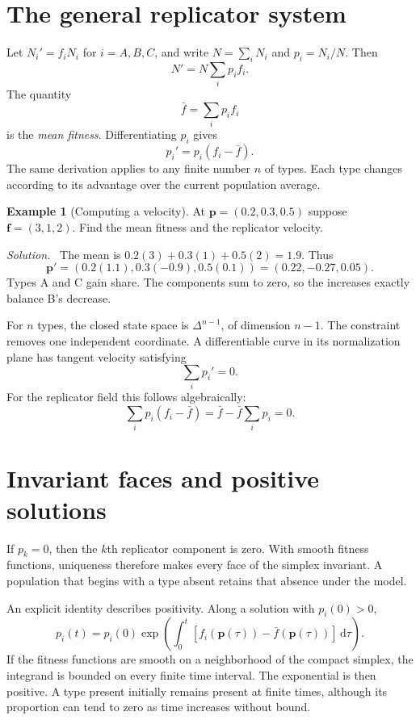 \documentclass[11pt,oneside,openany]{book}
\theoremstyle{definition}
\newtheorem{example}{Example}[chapter]
\theoremstyle{remark}
\newenvironment{solution}{\par\smallskip\noindent\textit{Solution.}\ }{\par\smallskip}
\newcommand{\dd}{\,\mathrm{d}}
\newcommand{\p}{\mathbf{p}}
\newcommand{\f}{\mathbf{f}}
\numberwithin{equation}{chapter}
\begin{document}
\section{The general replicator system}
Let $N_i'=f_iN_i$ for $i=A,B,C$, and write $N=\sum_iN_i$ and $p_i=N_i/N$. Then
\[
N'=N\sum_i p_i f_i.
\]
The quantity
\[
\bar f=\sum_i p_i f_i
\]
is the \emph{mean fitness}. Differentiating $p_i$ gives
\begin{equation}\label{eq:generalrep}
\boxed{p_i'=p_i(f_i-\bar f).}
\end{equation}
The same derivation applies to any finite number $n$ of types. Each type changes according to its advantage over the current population average.

\begin{example}[Computing a velocity]
At $\p=(0.2,0.3,0.5)$ suppose $\f=(3,1,2)$. Find the mean fitness and the replicator velocity.
\begin{solution}
The mean is $0.2(3)+0.3(1)+0.5(2)=1.9$. Thus
\[
\p'=(0.2(1.1),0.3(-0.9),0.5(0.1))=(0.22,-0.27,0.05).
\]
Types A and C gain share. The components sum to zero, so the increases exactly balance B's decrease.
\end{solution}
\end{example}

For $n$ types, the closed state space is $\Delta^{n-1}$, of dimension $n-1$. The constraint removes one independent coordinate. A differentiable curve in its normalization plane has tangent velocity satisfying
\begin{equation}\label{eq:tangent}
\sum_i p_i'=0.
\end{equation}
For the replicator field this follows algebraically:
\[
\sum_i p_i(f_i-\bar f)=\bar f-\bar f\sum_i p_i=0.
\]

\section{Invariant faces and positive solutions}
If $p_k=0$, then the $k$th replicator component is zero. With smooth fitness functions, uniqueness therefore makes every face of the simplex invariant. A population that begins with a type absent retains that absence under the model.

An explicit identity describes positivity. Along a solution with $p_i(0)>0$,
\begin{equation}\label{eq:positivity}
p_i(t)=p_i(0)\exp\left(\int_0^t[f_i(\p(\tau))-\bar f(\p(\tau))]\dd\tau\right).
\end{equation}
If the fitness functions are smooth on a neighborhood of the compact simplex, the integrand is bounded on every finite time interval. The exponential is then positive. A type present initially remains present at finite times, although its proportion can tend to zero as time increases without bound.
\end{document}
